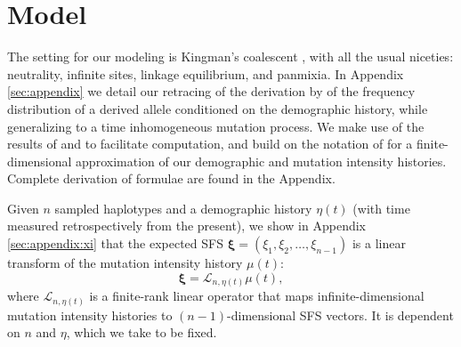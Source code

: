 \documentclass[11pt]{article}
\begin{document}
\section*{Model}\label{sec:model}

The setting for our modeling is Kingman's coalescent \cite{Kingman1982-ge, Kingman1982-tf, Kingman1982-ys, Kingman2000-jr}, with all the usual niceties: neutrality, infinite sites, linkage equilibrium, and panmixia.
In Appendix \ref{sec:appendix} we detail our retracing of the derivation by \cite{Griffiths1998-qf} of the frequency distribution of a derived allele conditioned on the demographic history, while generalizing to a time inhomogeneous mutation process.
We make use of the results of \cite{Polanski2003-kg} and \cite{Polanski2003-ll} to facilitate computation, and build on the notation of \cite{Rosen2018-bb} for a finite-dimensional approximation of our demographic and mutation intensity histories.
Complete derivation of formulae are found in the Appendix.

Given $n$ sampled haplotypes and a demographic history $\eta(t)$ (with time measured retrospectively from the present), we show in Appendix \ref{sec:appendix:xi} that the expected SFS $\boldsymbol \xi = (\xi_1, \xi_2,\dots, \xi_{n-1})$ is a linear transform of the mutation intensity history $\mu(t)$:
\begin{equation}
  \label{eqn:transform}
\boldsymbol \xi = \mathcal{L}_{n,\eta(t)}\mu(t),
\end{equation}
where $\mathcal{L}_{n,\eta(t)}$ is a finite-rank linear operator that maps infinite-dimensional mutation intensity histories to $(n-1)$-dimensional SFS vectors.
It is dependent on $n$ and $\eta$, which we take to be fixed.

\end{document}

